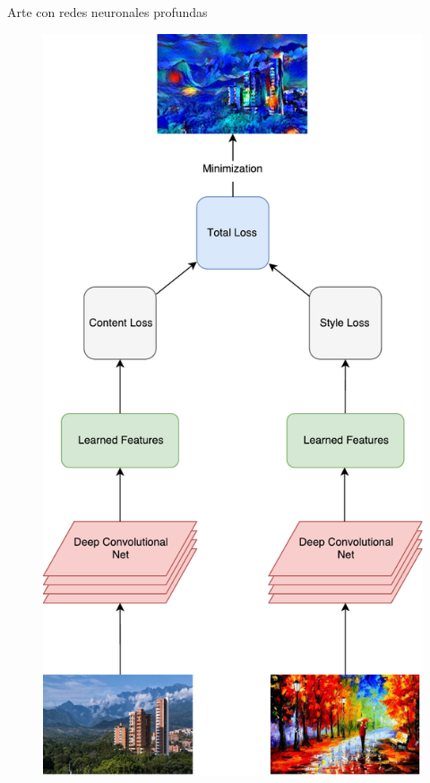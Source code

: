 \documentclass[11pt,usenames, dvipsnames]{beamer}
\begin{document}
\begin{frame}{Arte con redes neuronales profundas}
    \begin{figure}
        \includegraphics[height=0.8\textheight]{figures/art}
    \end{figure}
\end{frame}
\end{document}
